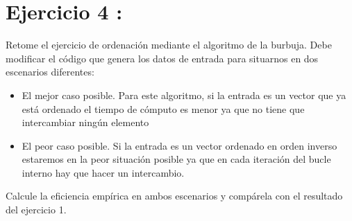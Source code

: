 \documentclass{article}
\begin{document}
\clearpage
\section{Ejercicio 4 :}
Retome el ejercicio de ordenación mediante el algoritmo de la burbuja. Debe modificar el
código que genera los datos de entrada para situarnos en dos escenarios diferentes:
\begin{itemize}
	\item El mejor caso posible. Para este algoritmo, si la entrada es un vector que ya está ordenado el tiempo de cómputo es menor ya que no tiene que intercambiar ningún elemento
	\item El peor caso posible. Si la entrada es un vector ordenado en orden inverso estaremos en la peor situación posible ya que en cada iteración del bucle interno hay que hacer un intercambio.
\end{itemize}
	Calcule la eficiencia empírica en ambos escenarios y compárela con el resultado del ejercicio 1.
\end{document}
